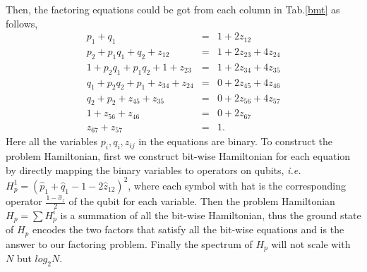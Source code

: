 \documentclass[twocolumn,showpacs,twoside,10pt,prl]{revtex4}
\begin{document}
Then, the factoring equations could be got from each column in
Tab.\ref{bmt} as follows,
\begin{eqnarray}
p_1+q_1 &=& 1 + 2z_{12}  \nonumber\\
p_2+p_1q_1+q_2 +z_{12} &=& 1 + 2z_{23} +4z_{24}\nonumber\\
1+p_2q_1+p_1q_2+1 +z_{23}&=&1 + 2z_{34} +4z_{35}\nonumber\\
q_1+p_2q_2+p_1+z_{34}+z_{24}&=& 0 + 2z_{45} +4z_{46}\nonumber\\
q_2+p_2+z_{45}+z_{35}&=&0+ 2z_{56} +4z_{57}\nonumber\\
1+z_{56}+z_{46} &=&0+ 2z_{67}\nonumber\\
z_{67}+z_{57} &=& 1.
\end{eqnarray}
Here all the variables $p_i,q_i,z_{ij}$ in the equations are binary.
To construct the problem Hamiltonian, first we construct bit-wise
Hamiltonian for each equation by directly mapping the binary
variables to operators on qubits, \emph{i.e.} $ H_p^1=
(\hat{p}_1+\hat{q}_1 - 1 -2\hat{z}_{12})^2$, where each symbol with
hat is the corresponding operator $\frac{1-\hat{\sigma}_z}{2}$ of
the qubit for each variable. Then the problem Hamiltonian $H_p= \sum{H_p^{i}}$ is a
summation of all the bit-wise Hamiltonian, thus the ground state of $H_p$
encodes the two factors that satisfy all the bit-wise
equations and is the answer to our factoring problem. Finally the
spectrum of $H_p$ will not scale with $N$ but $log_2{N}$.
\end{document}
